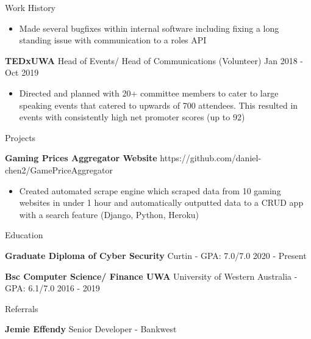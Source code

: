 \documentclass{resume} %
\begin{document}
\begin{rSection}{Work History}
\begin{itemize}
			\item Made several bugfixes within internal software including fixing a long standing issue with communication to a roles API
		\end{itemize}
		\item \textbf{TEDxUWA} {Head of Events/ Head of Communications} (Volunteer) \hfill Jan 2018 - Oct 2019
		\begin{itemize} 
			\item Directed and planned with 20+ committee members to cater to large speaking events that catered to upwards of 700 attendees. This resulted in events with consistently high net promoter scores (up to 92)  
		\end{itemize}
	\end{rSection} 
	
	\begin{rSection}{Projects}
		\vspace{-1.25em}
	
		\item \textbf{Gaming Prices Aggregator Website} {\hfill {} https://github.com/daniel-chen2/GamePriceAggregator}  
		\begin{itemize} 
			\item Created automated scrape engine which scraped data from 10 gaming websites in under 1 hour and automatically outputted data to a CRUD app with a search feature (Django, Python, Heroku)
		\end{itemize}
	\end{rSection} 
	
	\begin{rSection}{Education}
		\vspace{-1.25em}
		\item \textbf{Graduate Diploma of Cyber Security} {Curtin} - GPA: 7.0/7.0 \hfill 2020 - Present
		\item \textbf{Bsc Computer Science/ Finance UWA} {University of Western Australia} - GPA: 6.1/7.0 \hfill 2016 - 2019
	\end{rSection} 
	
	\begin{rSection}{Referrals} 
		\vspace{-1.25em}
		\item \textbf{Jemie Effendy} {Senior Developer - Bankwest} 
			\hfill 
	\end{rSection}
\end{document}
